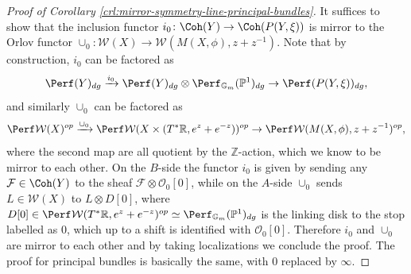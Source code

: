 \begin{proof}[Proof of Corollary \ref{crl:mirror-symmetry-line-principal-bundles}]
    It suffices to show that the inclusion functor $i_0\colon\Coh (Y)\to\Coh (P(Y,\xi))$ is mirror to the Orlov functor $\cup_0\colon\mathcal{W} (X)\to\mathcal{W} (M(X,\phi),z+z^{-1})$. Note that by construction, $i_0$ can be factored as \[
        \Perf (Y)_{dg}\xrightarrow{i_0}\Perf (Y)_{dg}\otimes\Perf_{\mathbb{G}_m}(\mathbb{P}^1)_{dg}\to\Perf (P(Y,\xi))_{dg},
    \]and similarly $\cup_0$ can be factored as \[
        \Perf\mathcal{W} (X)^{op}\xrightarrow{\cup_0}\Perf\mathcal{W} (X\times (T^{\ast}\mathbb{R},e^z+e^{-z}))^{op}\to\Perf\mathcal{W} (M(X,\phi),z+z^{-1})^{op},
    \]where the second map are all quotient by the $\mathbb{Z}$-action, which we know to be mirror to each other. On the $B$-side the functor $i_0$ is given by sending any $\mathcal{F}\in\Coh (Y)$ to the sheaf $\mathcal{F}\otimes\mathcal{O}_0 [0]$, while on the $A$-side $\cup_0$ sends $L\in\mathcal{W} (X)$ to $L\otimes D[0]$, where $D[0]\in\Perf\mathcal{W} (T^{\ast}\mathbb{R},e^z+e^{-z})^{op}\simeq\Perf_{\mathbb{G}_m} (\mathbb{P}^1)_{dg}$ is the linking disk to the stop labelled as $0$, which up to a shift is identified with $\mathcal{O}_0 [0]$. Therefore $i_0$ and $\cup_0$ are mirror to each other and by taking localizations we conclude the proof. The proof for principal bundles is basically the same, with $0$ replaced by $\infty$.
\end{proof}
